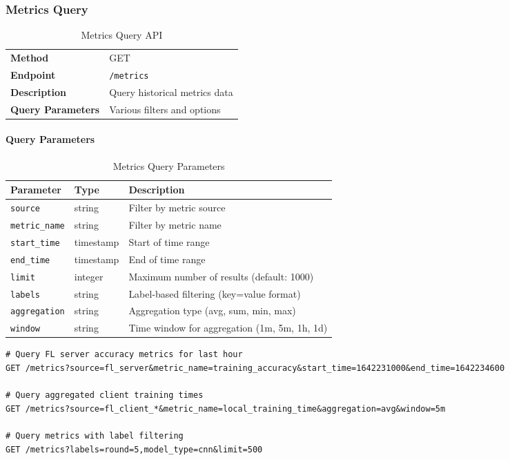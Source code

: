 \subsubsection{Metrics Query}

\begin{table}[H]
\centering
\caption{Metrics Query API}
\label{tab:metrics-query-api}
\begin{tabularx}{\textwidth}{@{}lX@{}}
\toprule
\textbf{Method} & GET \\
\textbf{Endpoint} & \texttt{/metrics} \\
\textbf{Description} & Query historical metrics data \\
\textbf{Query Parameters} & Various filters and options \\
\bottomrule
\end{tabularx}
\end{table}

\paragraph{Query Parameters}

\begin{table}[H]
\centering
\caption{Metrics Query Parameters}
\label{tab:metrics-query-params}
\begin{tabularx}{\textwidth}{@{}llX@{}}
\toprule
\textbf{Parameter} & \textbf{Type} & \textbf{Description} \\
\midrule
\texttt{source} & string & Filter by metric source \\
\texttt{metric\_name} & string & Filter by metric name \\
\texttt{start\_time} & timestamp & Start of time range \\
\texttt{end\_time} & timestamp & End of time range \\
\texttt{limit} & integer & Maximum number of results (default: 1000) \\
\texttt{labels} & string & Label-based filtering (key=value format) \\
\texttt{aggregation} & string & Aggregation type (avg, sum, min, max) \\
\texttt{window} & string & Time window for aggregation (1m, 5m, 1h, 1d) \\
\bottomrule
\end{tabularx}
\end{table}

\begin{lstlisting}[style=pythoncode, caption=Metrics Query Examples]
# Query FL server accuracy metrics for last hour
GET /metrics?source=fl_server&metric_name=training_accuracy&start_time=1642231000&end_time=1642234600

# Query aggregated client training times
GET /metrics?source=fl_client_*&metric_name=local_training_time&aggregation=avg&window=5m

# Query metrics with label filtering
GET /metrics?labels=round=5,model_type=cnn&limit=500
\end{lstlisting}

